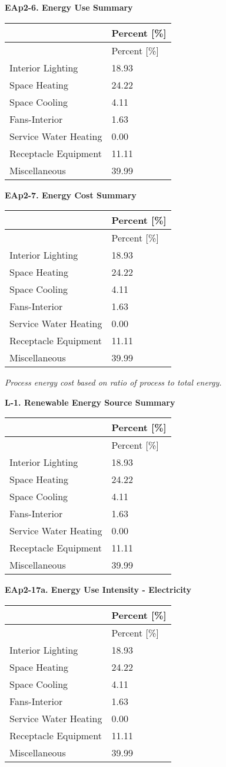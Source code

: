 \textbf{EAp2-6. Energy Use Summary}

\begin{longtable}[c]{@{}ll@{}}
\toprule 
 & Percent [\%] \tabularnewline
\midrule
\endfirsthead

\toprule 
 & Percent [\%] \tabularnewline
\midrule
\endhead

Interior Lighting & 18.93 \tabularnewline
Space Heating & 24.22 \tabularnewline
Space Cooling & 4.11 \tabularnewline
Fans-Interior & 1.63 \tabularnewline
Service Water Heating & 0.00 \tabularnewline
Receptacle Equipment & 11.11 \tabularnewline
Miscellaneous & 39.99 \tabularnewline
\bottomrule
\end{longtable}

\textbf{EAp2-7. Energy Cost Summary}

\begin{longtable}[c]{@{}ll@{}}
\toprule 
 & Percent [\%] \tabularnewline
\midrule
\endfirsthead

\toprule 
 & Percent [\%] \tabularnewline
\midrule
\endhead

Interior Lighting & 18.93 \tabularnewline
Space Heating & 24.22 \tabularnewline
Space Cooling & 4.11 \tabularnewline
Fans-Interior & 1.63 \tabularnewline
Service Water Heating & 0.00 \tabularnewline
Receptacle Equipment & 11.11 \tabularnewline
Miscellaneous & 39.99 \tabularnewline
\bottomrule
\end{longtable}

\emph{Process energy cost based on ratio of process to total energy.}

\textbf{L-1. Renewable Energy Source Summary}

\begin{longtable}[c]{@{}ll@{}}
\toprule 
 & Percent [\%] \tabularnewline
\midrule
\endfirsthead

\toprule 
 & Percent [\%] \tabularnewline
\midrule
\endhead

Interior Lighting & 18.93 \tabularnewline
Space Heating & 24.22 \tabularnewline
Space Cooling & 4.11 \tabularnewline
Fans-Interior & 1.63 \tabularnewline
Service Water Heating & 0.00 \tabularnewline
Receptacle Equipment & 11.11 \tabularnewline
Miscellaneous & 39.99 \tabularnewline
\bottomrule
\end{longtable}

\textbf{EAp2-17a. Energy Use Intensity - Electricity}

\begin{longtable}[c]{@{}ll@{}}
\toprule 
 & Percent [\%] \tabularnewline
\midrule
\endfirsthead

\toprule 
 & Percent [\%] \tabularnewline
\midrule
\endhead

Interior Lighting & 18.93 \tabularnewline
Space Heating & 24.22 \tabularnewline
Space Cooling & 4.11 \tabularnewline
Fans-Interior & 1.63 \tabularnewline
Service Water Heating & 0.00 \tabularnewline
Receptacle Equipment & 11.11 \tabularnewline
Miscellaneous & 39.99 \tabularnewline
\bottomrule
\end{longtable}


